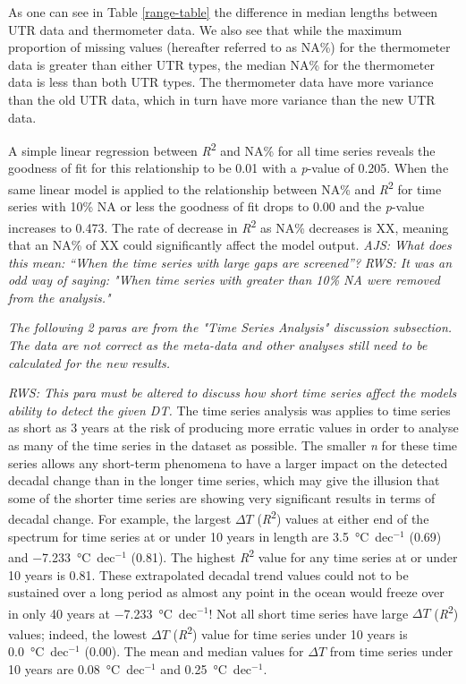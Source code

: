 \documentclass{ametsoc}
\begin{document}
As one can see in Table \ref{range-table} the difference in median lengths between UTR data and thermometer data. We also see that while the maximum proportion of missing values (hereafter referred to as NA\%) for the thermometer data is greater than either UTR types, the median NA\% for the thermometer data is less than both UTR types. The thermometer data have more variance than the old UTR data, which in turn have more variance than the new UTR data.

A simple linear regression between \emph{R}\textsuperscript{2} and NA\% for all time series reveals the goodness of fit for this relationship to be 0.01 with a \emph{p}-value of 0.205. When the same linear model is applied to the relationship between NA\% and \emph{R}\textsuperscript{2} for time series with 10\% NA or less the goodness of fit drops to 0.00 and the \emph{p}-value increases to 0.473. The rate of decrease in \emph{R}\textsuperscript{2} as NA\% decreases is XX, meaning that an NA\% of XX could significantly affect the model output.
\emph{AJS: What does this mean: ``When the time series with large gaps are screened''?}
\emph{RWS: It was an odd way of saying: "When time series with greater than 10\% NA were removed from the analysis."}



\emph{The following 2 paras are from the "Time Series Analysis" discussion subsection. The data are not correct as the meta-data and other analyses still need to be calculated for the new results.}

\emph{RWS: This para must be altered to discuss how short time series affect the models ability to detect the given DT.}
The time series analysis was applies to time series as short as 3 years at the risk of producing more erratic values in order to analyse as many of the time series in the dataset as possible. The smaller \emph{n} for these time series allows any short-term phenomena to have a larger impact on the detected decadal change than in the longer time series, which may give the illusion that some of the shorter time series are showing very significant results in terms of decadal change. For example, the largest $\Delta T$ (\emph{R}\textsuperscript{2}) values at either end of the spectrum for time series at or under 10 years in length are \SI{3.5}{\degreeCelsius}~dec$^{-1}$ (0.69) and \SI{-7.233}{\degreeCelsius}~dec$^{-1}$ (0.81). The highest \emph{R}\textsuperscript{2} value for any time series at or under 10 years is 0.81. These extrapolated decadal trend values could not to be sustained over a long period as almost any point in the ocean would freeze over in only 40 years at \SI{-7.233}{\degreeCelsius}~dec$^{-1}$! Not all short time series have large $\Delta T$ (\emph{R}\textsuperscript{2}) values; indeed, the lowest $\Delta T$ (\emph{R}\textsuperscript{2}) value for time series under 10 years is \SI{0.0}{\degreeCelsius}~dec$^{-1}$ (0.00). The mean and median values for $\Delta T$ from time series under 10 years are \SI{0.08}{\degreeCelsius}~dec$^{-1}$ and \SI{0.25}{\degreeCelsius}~dec$^{-1}$.
\end{document}
